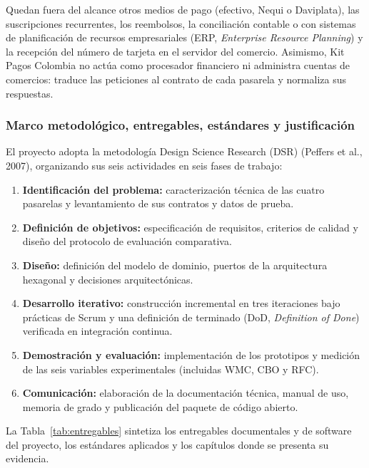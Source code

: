 Quedan fuera del alcance otros medios de pago (efectivo, Nequi o Daviplata), las suscripciones recurrentes, los reembolsos, la conciliación contable o con sistemas de planificación de recursos empresariales (ERP, \textit{Enterprise Resource Planning}) y la recepción del número de tarjeta en el servidor del comercio. Asimismo, Kit Pagos Colombia no actúa como procesador financiero ni administra cuentas de comercios: traduce las peticiones al contrato de cada pasarela y normaliza sus respuestas.

\subsubsection{Marco metodológico, entregables, estándares y justificación}
El proyecto adopta la metodología Design Science Research (DSR) (Peffers et al., 2007), organizando sus seis actividades en seis fases de trabajo:
\begin{enumerate}
    \item \textbf{Identificación del problema:} caracterización técnica de las cuatro pasarelas y levantamiento de sus contratos y datos de prueba.
    \item \textbf{Definición de objetivos:} especificación de requisitos, criterios de calidad y diseño del protocolo de evaluación comparativa.
    \item \textbf{Diseño:} definición del modelo de dominio, puertos de la arquitectura hexagonal y decisiones arquitectónicas.
    \item \textbf{Desarrollo iterativo:} construcción incremental en tres iteraciones bajo prácticas de Scrum y una definición de terminado (DoD, \textit{Definition of Done}) verificada en integración continua.
    \item \textbf{Demostración y evaluación:} implementación de los prototipos y medición de las seis variables experimentales (incluidas WMC, CBO y RFC).
    \item \textbf{Comunicación:} elaboración de la documentación técnica, manual de uso, memoria de grado y publicación del paquete de código abierto.
\end{enumerate}

La Tabla~\ref{tab:entregables} sintetiza los entregables documentales y de software del proyecto, los estándares aplicados y los capítulos donde se presenta su evidencia.


